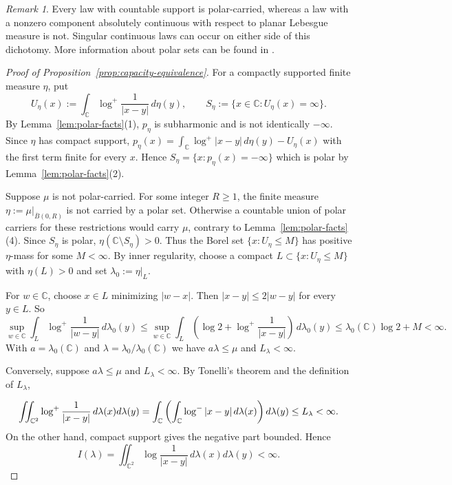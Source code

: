 \documentclass[10pt,reqno]{amsart}
\theoremstyle{remark}
\newtheorem{remark}[theorem]{Remark}
\newcommand{\C}{\mathbb C}
\newcommand{\logp}{\log^+}
\begin{document}
\begin{remark}
    Every law with countable support is polar-carried, whereas a law with a nonzero component absolutely continuous with respect to planar Lebesgue measure is not. Singular continuous laws can occur on either side of this dichotomy. More information about polar sets can be found in \cite[Sections 3.2 and 5.1]{Ran95}.
\end{remark}

\begin{proof}[Proof of Proposition~\ref{prop:capacity-equivalence}]

For a compactly supported finite measure $\eta$, put
\[U_\eta(x):=
\int_{\C}\log^+\frac{1}{|x-y|}\,d\eta(y),\qquad S_\eta:=\{x\in\C:U_\eta(x)=\infty\}.\]
By Lemma~\ref{lem:polar-facts}(1), $p_\eta$ is subharmonic and is not identically $-\infty$. Since $\eta$ has compact support, 
$p_\eta(x)=\int_{\C}\log^+|x-y|\,d\eta(y)-U_\eta(x)$ with the first term finite for every $x$. Hence $S_\eta=\{x:p_\eta(x)=-\infty\}$ which is polar by Lemma~\ref{lem:polar-facts}(2).

Suppose $\mu$ is not polar-carried. For some integer $R\ge 1$, the finite measure $\eta:=\mu|_{\overline{B}(0,R)}$ is not carried by a polar set. Otherwise a countable union of polar carriers for these restrictions would carry $\mu$, contrary to Lemma~\ref{lem:polar-facts}(4). Since $S_\eta$ is polar, $\eta(\C\setminus S_\eta)>0$. Thus the Borel set $\{x:U_\eta\le M\}$ has positive $\eta$-mass for some $M<\infty$. By inner regularity, choose a compact $L\subset \{x:U_\eta\le M\}$ with $\eta(L)>0$ and set $\lambda_0:=\eta|_L$.

For $w\in \C$, choose $x\in L$ minimizing $|w-x|$. Then $|x-y|\le 2|w-y|$ for every $y\in L$. So 
\[\sup_{w\in \C}\int_L\logp\frac{1}{|w-y|}\,d\lambda_0(y)\le \sup_{w\in \C}\int_L\left(\log 2+\logp\frac{1}{|x-y|}\right)\,d\lambda_0(y)\le \lambda_0(\C)\log 2+ M<\infty.\] With $a=\lambda_0(\C)$ and $\lambda=\lambda_0/\lambda_0(\C)$ we have $a\lambda\le \mu$ and $L_\lambda<\infty$.

Conversely, suppose $a\lambda\le\mu$ and $L_\lambda<\infty$. By Tonelli's theorem and the definition of $L_\lambda$,

\[\iint_{\C^2}\log^+\frac1{|x-y|}\,d\lambda(x)d\lambda(y)
=\int_{\C}\left(\int_{\C}\log^-|x-y|\,d\lambda(x)\right)d\lambda(y)\\
\le L_\lambda<\infty.\]
On the other hand, compact support gives the negative part bounded. Hence
\[I(\lambda)=\iint_{\C^2}\log\frac1{|x-y|}\,d\lambda(x)d\lambda(y)<\infty.\]


\end{proof}
\end{document}
